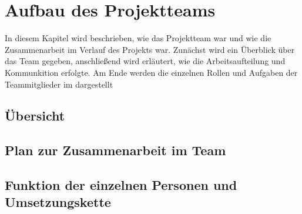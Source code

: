 \chapter{Aufbau des Projektteams}
In diesem Kapitel wird beschrieben, wie das Projektteam war und wie die 
Zusammenarbeit im Verlauf des Projekts war. Zunächst wird ein Überblick über
das Team gegeben, anschließend wird erläutert, wie die Arbeitsaufteilung
und Kommunkition erfolgte. Am Ende werden die einzelnen Rollen und Aufgaben
der Teammitglieder im dargestellt

\section{Übersicht}

\section{Plan zur Zusammenarbeit im Team}

\section{Funktion der einzelnen Personen und Umsetzungskette}